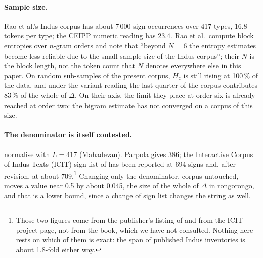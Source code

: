 \documentclass[11pt,a4paper]{article}
\newcommand{\Hc}{H_{\mathrm{c}}}
\begin{document}
\paragraph{Sample size.} Rao et al.'s Indus corpus has about 7\,000 sign occurrences over 417 types, 16.8 tokens per type; the CEIPP numeric reading has 23.4. Rao et al.\ compute block entropies over $n$-gram orders and note that ``beyond $N=6$ the entropy estimates become less reliable due to the small sample size of the Indus corpus''; their $N$ is the block length, not the token count that $N$ denotes everywhere else in this paper. On random sub-samples of the present corpus, $\Hc$ is still rising at 100\,\% of the data, and under the variant reading the last quarter of the corpus contributes 83\,\% of the whole of $\Delta$. On their axis, the limit they place at order six is already reached at order two: the bigram estimate has not converged on a corpus of this size.

\paragraph{The denominator is itself contested.} \citet{rao2010reply} normalise with $L=417$ (Mahadevan). Parpola gives 386; the Interactive Corpus of Indus Texts (ICIT) sign list of \citet{wells2015} has been reported at 694 signs and, after revision, at about 709.\footnote{Those two figures come from the publisher's listing of \citet{wells2015} and from the ICIT project page, not from the book, which we have not consulted. Nothing here rests on which of them is exact: the span of published Indus inventories is about 1.8-fold either way.} Changing only the denominator, corpus untouched, moves a value near 0.5 by about 0.045, the size of the whole of $\Delta$ in rongorongo, and that is a lower bound, since a change of sign list changes the string as well.
\end{document}
